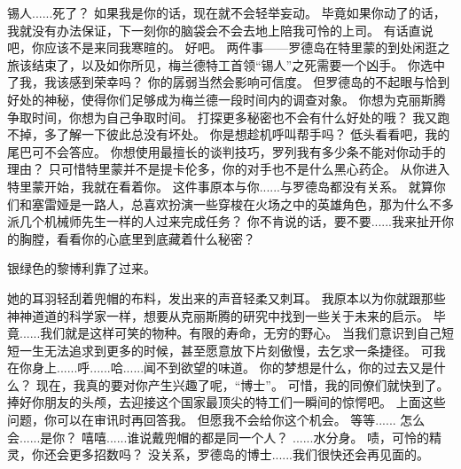 \documentclass[openany]{book}
\begin{document}
\begin{dialogue}
     锡人......死了？
     如果我是你的话，现在就不会轻举妄动。
     毕竟如果你动了的话，我就没有办法保证，下一刻你的脑袋会不会去地上陪我可怜的上司。
     有话直说吧，你应该不是来同我寒暄的。
     好吧。
     两件事——罗德岛在特里蒙的到处闲逛之旅该结束了，以及如你所见，梅兰德特工首领“锡人”之死需要一个凶手。
     你选中了我，我该感到荣幸吗？
     你的孱弱当然会影响可信度。
     但罗德岛的不起眼与恰到好处的神秘，使得你们足够成为梅兰德一段时间内的调查对象。
     你想为克丽斯腾争取时间，你想为自己争取时间。
     打探更多秘密也不会有什么好处的哦？
     我又跑不掉，多了解一下彼此总没有坏处。
     你是想趁机呼叫帮手吗？
     低头看看吧，我的尾巴可不会答应。
     你想使用最擅长的谈判技巧，罗列我有多少条不能对你动手的理由？
     只可惜特里蒙并不是提卡伦多，你的对手也不是什么黑心药企。
     从你进入特里蒙开始，我就在看着你。
     这件事原本与你......与罗德岛都没有关系。
     就算你们和塞雷娅是一路人，总喜欢扮演一些穿梭在火场之中的英雄角色，那为什么不多派几个机械师先生一样的人过来完成任务？
     你不肯说的话，要不要......我来扯开你的胸膛，看看你的心底里到底藏着什么秘密？\par
    银绿色的黎博利靠了过来。\par
    她的耳羽轻刮着兜帽的布料，发出来的声音轻柔又刺耳。
     我原本以为你就跟那些神神道道的科学家一样，想要从克丽斯腾的研究中找到一些关于未来的启示。
     毕竟......我们就是这样可笑的物种。有限的寿命，无穷的野心。
     当我们意识到自己短短一生无法追求到更多的时候，甚至愿意放下片刻傲慢，去乞求一条捷径。
     可我在你身上......呼......哈......闻不到欲望的味道。
     你的梦想是什么，你的过去又是什么？
     现在，我真的要对你产生兴趣了呢，“博士”。
     可惜，我的同僚们就快到了。
     捧好你朋友的头颅，去迎接这个国家最顶尖的特工们一瞬间的惊愕吧。
     上面这些问题，你可以在审讯时再回答我。
     但愿我不会给你这个机会。
     等等......
     怎么会......是你？
     嘻嘻......谁说戴兜帽的都是同一个人？
     ......水分身。
     啧，可怜的精灵，你还会更多招数吗？
     没关系，罗德岛的博士......我们很快还会再见面的。

\end{dialogue}
\end{document}
